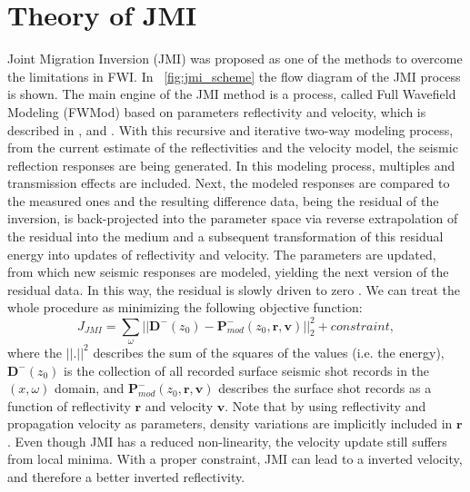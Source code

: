 \section{Theory of JMI}
Joint Migration Inversion (JMI) was proposed as one of the methods to overcome the  limitations in FWI. In ~\ref{fig:jmi_scheme} the flow diagram of the JMI process is shown. The main engine of the JMI method is a  process, called Full Wavefield Modeling (FWMod) based on  parameters reflectivity and velocity, which is described in \cite{Berkhout12}, \cite{Davydenko12a}\new{,} and \cite{Berkhout14a}. With this recursive and iterative two-way modeling process, from the current estimate of the reflectivities and the velocity model, the seismic reflection responses are being generated. In this modeling process, multiples and transmission effects are included. Next, the modeled responses are compared to the measured ones and the resulting difference data, being the residual of the inversion, is back-projected into the parameter space via reverse extrapolation of the residual into the medium and a subsequent transformation of this residual energy into updates of reflectivity and velocity. The parameters are updated, from which new seismic responses are modeled, yielding the next version of the residual data. In this way, the residual is slowly driven to zero \cite[]{Berkhout12,Staal12,Staal13,Berkhout14c}. We can treat the whole procedure as minimizing the following objective function:
\begin{equation}
J_{JMI} = \sum\limits_{\omega} || \mathbf{D}^-\left(z_0\right) - \mathbf{P}^-_{mod} \left( z_0,\mathbf{r}, \mathbf{v} \right) ||_2 ^2  + constraint,
\label{eq1:JMI inversion}
\end{equation}
where the $|| . ||^2$ describes the sum of the squares of the values (i.e.\new{,} the energy), $\mathbf{D}^-\left(z_0\right)$ is the collection of all recorded surface seismic shot records in the $\left( x,\omega \right)$ domain, and $\mathbf{P}^-_{mod} \left( z_0,\mathbf{r}, \mathbf{v} \right)$ describes the  surface shot records as a function of reflectivity $\mathbf{r}$ and velocity $\mathbf{v}$. Note that by using  reflectivity and propagation velocity as parameters, density variations are implicitly included in $\mathbf{r}$. Even though JMI has a reduced non-linearity, the velocity update still suffers from local minima. With a proper constraint, JMI can lead to a  inverted velocity, and therefore a better inverted reflectivity.

